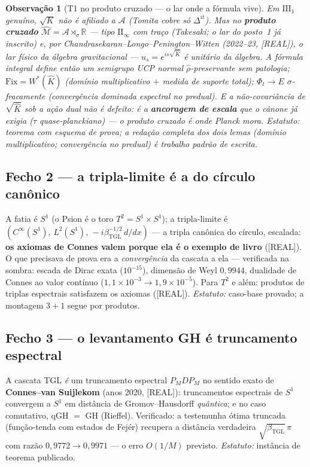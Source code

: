 \documentclass[11pt,a4paper]{article}
\newcommand{\REAL}{\textsf{[REAL]}}
\newcommand{\bTGL}{\beta_{\mathrm{TGL}}}
\newcommand{\Alg}{\mathcal A}
\newtheorem{remark}{Observação}
\begin{document}
\begin{remark}[T1 no produto cruzado --- o lar onde a fórmula vive]
Em $\mathrm{III}_1$ genuíno, $\sqrt{K}$ não é afiliado a $\Alg$ (Tomita
cobre só $\Delta^{it}$). Mas no \textbf{produto cruzado}
$\widehat{\mathcal M}=\Alg\rtimes_\sigma\mathbb R$ --- tipo
$\mathrm{II}_\infty$ com traço (Takesaki; o lar do posto~1 já inscrito)
e, por Chandrasekaran--Longo--Penington--Witten (2022--23, \REAL), o
\emph{lar físico da álgebra gravitacional} --- $u_s=e^{is\sqrt{\hat K}}$
é unitário \emph{da} álgebra. A fórmula integral define então um
semigrupo UCP normal $\hat\rho$-preservante sem patologia;
$\mathrm{Fix}=W^*(\hat K)$ (domínio multiplicativo $+$ medida de suporte
total); $\Phi_t\to E$ $\sigma$-fracamente (convergência dominada
espectral no predual). E a não-covariância de $\sqrt{\hat K}$ sob a ação
dual não é defeito: é a \textbf{ancoragem de escala} que o cânone já
exigia ($\tau$ quase-planckiano) --- o produto cruzado é onde Planck
mora. \emph{Estatuto:} teorema com esquema de prova; a redação completa
dos dois lemas (domínio multiplicativo; convergência no predual) é
trabalho padrão de escrita.
\end{remark}

\subsection{Fecho 2 --- a tripla-limite é a do círculo canônico}
A fatia é $S^1$ (o Psion é o toro $T^2=S^1\times S^1$); a tripla-limite
é $(C^\infty(S^1),\,L^2(S^1),\,-i\beta_{\mathrm{TGL}}^{-1/2}\,d/dx)$ ---
a tripla canônica do círculo, escalada: \textbf{os axiomas de Connes
valem porque ela é o exemplo de livro} (\REAL). O que precisava de prova
era a \emph{convergência} da cascata a ela --- verificada na sombra:
escada de Dirac exata ($10^{-15}$), dimensão de Weyl $0{,}9944$,
dualidade de Connes ao valor contínuo
($1{,}1\times10^{-3}\to1{,}9\times10^{-5}$). Para $T^2$ e além: produtos
de triplas espectrais satisfazem os axiomas (\REAL). \emph{Estatuto:}
caso-base provado; a montagem $3{+}1$ segue por produtos.

\subsection{Fecho 3 --- o levantamento GH é truncamento espectral}
A cascata TGL \emph{é} um truncamento espectral $P_MDP_M$ no sentido
exato de \textbf{Connes--van Suijlekom} (anos 2020, \REAL):
truncamentos espectrais de $S^1$ convergem a $S^1$ em distância de
Gromov--Hausdorff \emph{quântica}; e no caso comutativo, qGH $=$ GH
(Rieffel). Verificado: a testemunha ótima truncada (função-tenda com
estados de Fejér) recupera a distância verdadeira
$\sqrt{\bTGL}\,\pi$ com razão $0{,}9772\to0{,}9971$ --- o erro
$O(1/M)$ previsto. \emph{Estatuto:} instância de teorema publicado.
\end{document}
